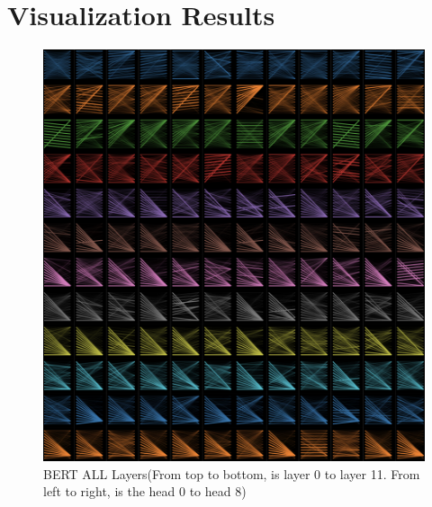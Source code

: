 \documentclass[fyp]{socreport}
\begin{document}






\appendix
\chapter{Visualization Results}

\begin{figure}[h]
    \centering
    \includegraphics[width=\linewidth]{./image/bert_all.png}
    \caption{BERT ALL Layers(From top to bottom, is layer 0 to layer 11. From left to right, is the head 0 to head 8)}
  \label{bert_all}
\end{figure}
\end{document}
